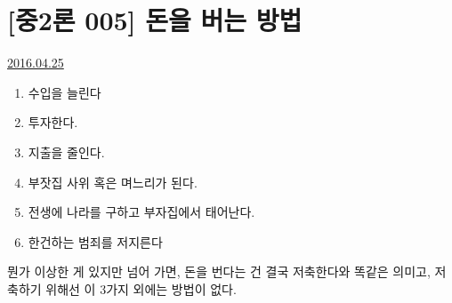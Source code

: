 \section{[중2론 005] 돈을 버는 방법}
\href{https://www.kockoc.com/Apoc/746336}{2016.04.25}

\vspace{5mm}
\begin{enumerate}
    \item 수입을 늘린다
    \item 투자한다.
    \item 지출을 줄인다.
    \item 부잣집 사위 혹은 며느리가 된다.
    \item 전생에 나라를 구하고 부자집에서 태어난다.
    \item 한건하는 범죄를 저지른다
\end{enumerate}
\vspace{5mm}

뭔가 이상한 게 있지만 넘어 가면, 돈을 번다는 건 결국 저축한다와 똑같은 의미고, 저축하기 위해선 이 3가지 외에는 방법이 없다.
\vspace{5mm}

